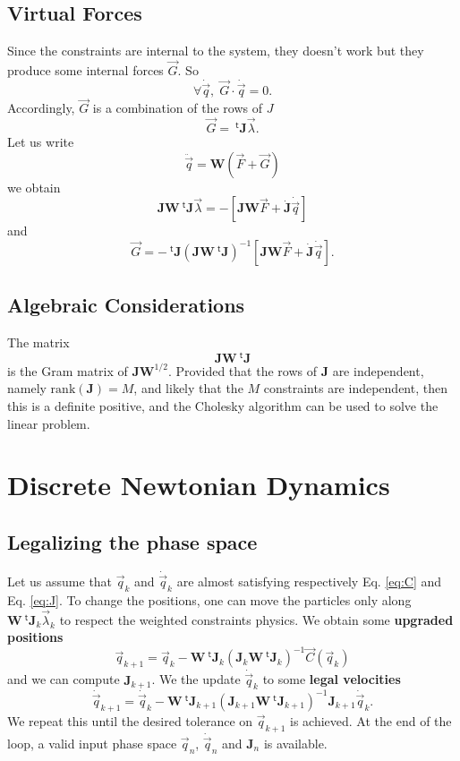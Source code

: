 \documentclass[11pt,aps,twocolumn]{revtex4}
\newcommand{\mymat}[1]{\boldsymbol{#1}}
\newcommand{\mytrn}[1]{{\!\!~^{\mathsf{t}}{#1}}}
\newcommand{\q}{\vec{q}}
\newcommand{\dq}{\dot{\q}}
\newcommand{\ddq}{\ddot{\q}}
\newcommand{\C}{\vec{C}}
\newcommand{\J}{\mymat{J}}
\newcommand{\dJ}{\dot{\J}}
\newcommand{\tJ}{\mytrn{\J}}
\newcommand{\G}{\vec{G}}
\newcommand{\W}{\mymat{W}}
\begin{document}
\subsection{Virtual Forces}
Since the constraints are internal to the system, they doesn't work but they produce some internal
forces $\G$. So
\begin{equation}
\forall \dq, \; \G\cdot\dq = 0.
\end{equation}
Accordingly, $\G$ is a combination of the rows of $J$
\begin{equation}
	\G = \tJ \vec{\lambda}.
\end{equation}
Let us write
\begin{equation}
	\ddq = \W \left( \vec{F} + \G \right)
\end{equation}
we obtain
\begin{equation}
	\J \W \tJ \vec{\lambda} = -\left\lbrack \J\W\vec{F} + \dJ \dq \right\rbrack
\end{equation}
and
\begin{equation}
	\G = - \tJ \left(\J \W \tJ \right)^{-1}\left\lbrack \J\W\vec{F} + \dJ \dq \right\rbrack.
\end{equation}

\subsection{Algebraic Considerations}
The matrix
\begin{equation}
	 \J \W \tJ 
\end{equation}
is the Gram matrix of $\J\W^{1/2}$.
Provided that the rows of $\J$ are independent, namely $\text{rank}(\J)=M$, and likely that the $M$ constraints are independent, 
then this is a definite positive, and the Cholesky algorithm can be used to solve the linear problem.

\section{Discrete Newtonian Dynamics}

\subsection{Legalizing the phase space}
Let us assume that $\q_k$ and $\dq_{k}$ are almost satisfying respectively Eq. \eqref{eq:C} and Eq. \eqref{eq:J}.
To change the positions, one can move the particles only along $\W\tJ_k \vec{\lambda}_k$ to respect the weighted constraints physics.
We obtain some \textbf{upgraded positions}
\begin{equation}
	\label{eq:legal_q}
	\q_{k+1} = \q_k - \W \tJ_k \left(\J_k \W \tJ_k \right)^{-1} \C(\q_k)
\end{equation}
and we can compute $\J_{k+1}$.
We the update $\dq_k$ to some \textbf{legal velocities}
\begin{equation}
	\label{eq:legal_dq}
	\dq_{k+1} = \dq_k - \W\tJ_{k+1} \left(\J_{k+1} \W \tJ_{k+1} \right)^{-1} \J_{k+1} \dq_k.
\end{equation}
We repeat this until the desired tolerance on $\q_{k+1}$ is achieved.
At the end of the loop, a valid input phase space $\q_{n}$, $\dq_{n}$ and $\J_n$ is available.
\end{document}
